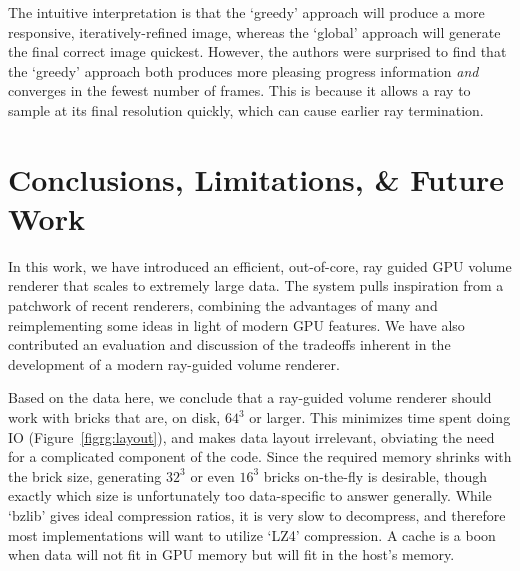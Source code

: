 



The intuitive interpretation is that the `greedy' approach will produce
a more responsive, iteratively-refined image, whereas the `global'
approach will generate the final correct image quickest.  However, the
authors were surprised to find that the `greedy' approach both produces
more pleasing progress information \emph{and} converges in the fewest
number of frames.  This is because it allows a ray to sample at its
final resolution quickly, which can cause earlier ray termination.

\section{Conclusions, Limitations, \& Future Work}
\label{sec:conclusion}

In this work, we have introduced an efficient, out-of-core, ray guided
GPU volume renderer that scales to extremely large data.  The system
pulls inspiration from a patchwork of recent renderers, combining the
advantages of many and reimplementing some ideas in light of modern GPU
features.  We have also contributed an evaluation and discussion of the
tradeoffs inherent in the development of a modern ray-guided volume
renderer.

Based on the data here, we conclude that a ray-guided volume renderer
should work with bricks that are, on disk, $64^3$ or larger.  This
minimizes time spent doing IO (Figure~\ref{figrg:layout}), and makes
data layout irrelevant, obviating the need for a complicated component
of the code.  Since the required memory shrinks with the brick size,
generating $32^3$ or even $16^3$ bricks on-the-fly is desirable,
though exactly which size is unfortunately too data-specific to answer
generally.  While `bzlib' gives ideal compression ratios, it is very
slow to decompress, and therefore most implementations will want to
utilize `LZ4' compression.  A cache is a boon when data will not fit in
GPU memory but will fit in the host's memory.

